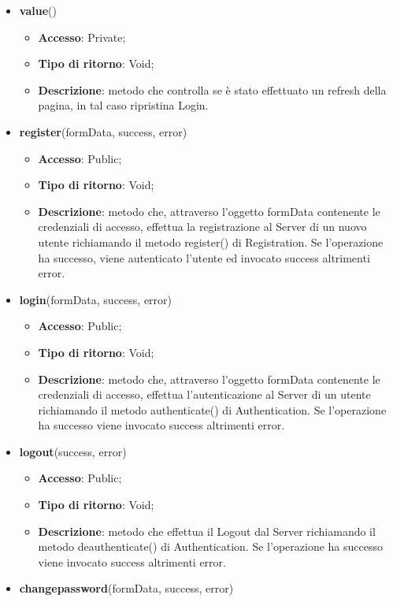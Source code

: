 {{{\begin{itemize}
				\item \textbf{value}()
				\begin{itemize}
					\item \textbf{Accesso}: Private;
					\item \textbf{Tipo di ritorno}: Void;
					\item \textbf{Descrizione}: metodo che controlla se è stato effettuato un refresh della pagina, in tal caso ripristina Login.
				\end{itemize}
				\item \textbf{register}(formData, success, error)
				\begin{itemize}
					\item \textbf{Accesso}: Public;
					\item \textbf{Tipo di ritorno}: Void;
					\item \textbf{Descrizione}: metodo che, attraverso l'oggetto formData contenente le credenziali di accesso, effettua la registrazione al Server di un nuovo utente richiamando il metodo register() di Registration. Se l'operazione ha successo, viene autenticato l'utente ed invocato success altrimenti error.
				\end{itemize}
				\item \textbf{login}(formData, success, error)
				\begin{itemize}
					\item \textbf{Accesso}: Public;
					\item \textbf{Tipo di ritorno}: Void;
					\item \textbf{Descrizione}: metodo che, attraverso l'oggetto formData contenente le credenziali di accesso, effettua l'autenticazione al Server di un utente richiamando il metodo authenticate() di Authentication. Se l'operazione ha successo viene invocato success altrimenti error.
				\end{itemize}
				\item \textbf{logout}(success, error)
				\begin{itemize}
					\item \textbf{Accesso}: Public;
					\item \textbf{Tipo di ritorno}: Void;
					\item \textbf{Descrizione}: metodo che effettua il Logout\ped{g} dal Server richiamando il metodo deauthenticate() di Authentication. Se l'operazione ha successo viene invocato success altrimenti error.
				\end{itemize}
				\item \textbf{changepassword}(formData, success, error)

\end{itemize}}}}
